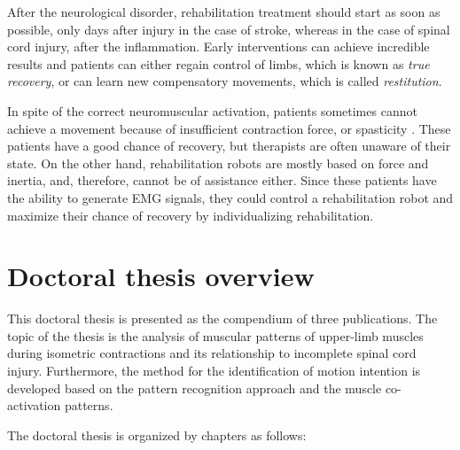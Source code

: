 After the neurological disorder, rehabilitation treatment should start as soon as possible, only days after injury in the case of stroke, whereas in the case of spinal cord injury, after the inflammation. Early interventions can achieve incredible results and patients can either regain control of limbs, which is known as \emph{true recovery}, or can learn new compensatory movements, which is called \emph{restitution}. 

In spite of the correct neuromuscular activation, patients sometimes cannot achieve a movement because of insufficient contraction force, or spasticity \citep{Liu2016b}. These patients have a good chance of recovery, but therapists are often unaware of their state. On the other hand, rehabilitation robots are mostly based on force and inertia, and, therefore, cannot be of assistance either. Since these patients have the ability to generate EMG signals, they could control a rehabilitation robot and maximize their chance of recovery by individualizing rehabilitation.




\section {Doctoral thesis overview}

This doctoral thesis is presented as the compendium of three publications. The topic of the thesis is the analysis of muscular patterns of upper-limb muscles during isometric contractions and its relationship to incomplete spinal cord injury. Furthermore, the method for the identification of motion intention is developed based on the pattern recognition approach and the muscle co-activation patterns. 

The doctoral thesis is organized by chapters as follows:

